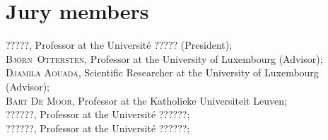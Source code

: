 
\chapter*{Jury members}


\noindent \textsc{?????}, Professor at the Universit{\'e} ????? (President); \\

\noindent \textsc{Bj\"orn~Ottersten}, Professor at the University of Luxembourg (Advisor); \\

\noindent \textsc{Djamila Aouada}, Scientific Researcher at the University of  
Luxembourg (Advisor); \\

\noindent \textsc{Bart De Moor}, Professor at the Katholieke Universiteit Leuven; \\

\noindent \textsc{??????}, Professor at the Universit{\'e} ??????; \\

\noindent \textsc{??????}, Professor at the Universit{\'e} ??????; \\

